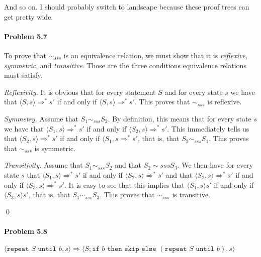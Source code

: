 And so on. I should probably switch to landscape because these proof trees can get pretty wide.

\paragraph{Problem 5.7} To prove that $\sim_{sss}$ is an equivalence relation, we must show that it is \textit{reflexive}, \textit{symmetric}, and \textit{transitive}. Those are the three conditions equivalence relations must satisfy.

\textit{Reflexivity.} It is obvious that for every statement $S$ and for every state $s$ we have that $\langle S, s \rangle \Rightarrow^* s'$ if and only if $\langle S, s \rangle \Rightarrow^* s'$. This proves that $\sim_{sss}$ is reflexive.

\textit{Symmetry.} Assume that $S_1 \sim_{sss} S_2$. By definition, this means that for every state $s$ we have that $\langle S_1, s \rangle \Rightarrow^* s'$ if and only if $\langle S_2, s \rangle \Rightarrow^* s'$. This immediately tells us that $\langle S_2, s \rangle \Rightarrow^* s'$ if and only if $\langle S_1, s \Rightarrow^* s'$, that is, that $S_2 \sim_{sss} S_1$. This proves that $\sim_{sss}$ is symmetric.

\textit{Transitivity.} Assume that $S_1 \sim_{sss} S_2$ and that $S_2 \sim{sss} S_3$. We then have for every state $s$ that $\langle S_1, s \rangle \Rightarrow^* s'$ if and only if $\langle S_2, s \rangle \Rightarrow^* s'$ and that $\langle S_2, s \rangle \Rightarrow^* s'$ if and only if $\langle S_3, s \rangle \Rightarrow^* s'$. It is easy to see that this implies that $\langle S_1, s \rangle s'$ if and only if $\langle S_3, s \rangle s'$, that is, that $S_1 \sim_{sss} S_3$. This proves that $\sim_{sss}$ is transitive.

\qed

\paragraph{Problem 5.8}

\begin{center}
    $\langle \texttt{repeat } S \texttt{ until } b, s \rangle \Rightarrow \langle S; \texttt{if } b \texttt{ then skip else } (\texttt{repeat } S \texttt{ until } b), s \rangle$
\end{center}



